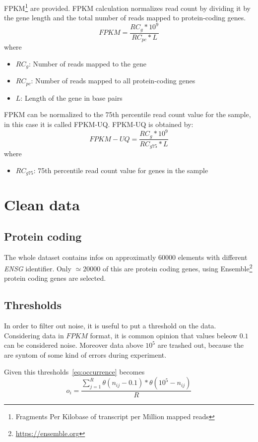 FPKM\footnote{Fragments Per Kilobase of transcript per Million mapped reads} are provided. 
FPKM calculation normalizes read count by dividing it by the gene length and the total number of reads mapped to protein-coding genes.
\begin{equation}
FPKM = \frac{RC_g*10^9}{RC_{pc}*L}
\end{equation}
where
\begin{itemize}
\item $RC_g$: Number of reads mapped to the gene
\item $RC_{pc}$: Number of reads mapped to all protein-coding genes
\item $L$: Length of the gene in base pairs
\end{itemize}

FPKM can be normalized to the 75th percentile read count value for the sample, in this case it is called FPKM-UQ. 
FPKM-UQ is obtained by:
\begin{equation}
FPKM - UQ = \frac{RC_g*10^9}{RC_{g75}*L}
\end{equation}
where
\begin{itemize}
\item $RC_{g75}$: 75th percentile read count value for genes in the sample 
\end{itemize}

\section{Clean data}
\subsection{Protein coding}
The whole dataset contains infos on approximatly $60000$ elements with different 
\textit{ENSG} identifier. Only $\simeq 20000$ of this are protein coding genes, 
using Ensemble\footnote{\url{https://ensemble.org}} protein coding genes are 
selected.

\subsection{Thresholds}\label{sec:threshold}
In order to filter out noise, it is useful to put a threshold on the data.
Considering data in $FPKM$ format, it is common opinion that values beleow 
$0.1$ can be considered noise. Moreover data above $10^5$ are trashed out, 
because the are syntom of some kind of errors during experiment.

Given this thresholds~\ref{eq:occurrence} becomes 
\begin{equation}
o_i=\frac{\sum_{j=1}^{R}\theta(n_{ij}-0.1)*\theta(10^5-n_{ij})}{R}
\end{equation}